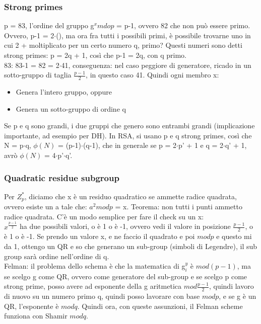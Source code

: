 \documentclass[16px]{article}
\begin{document}
\subsubsection{Strong primes}
p = 83, l'ordine del gruppo g$^xmdop$ = p-1, ovvero 82 che non può essere primo. Ovvero, p-1 = 2$\cdot$(), ma ora fra tutti i possibili primi, è possibile trovarne uno in cui 2 + moltiplicato per un certo numero q, primo? Questi numeri sono detti strong primes: p = 2q + 1, così che p-1 = 2q, con q primo.\\ 83: 83-1 = 82 = 2$\cdot$41, conseguenza: nel caso peggiore di generatore, ricado in un sotto-gruppo di taglia $\frac{p-1}{2}$, in questo caso 41. Quindi ogni membro x:
\begin{itemize}
\item Genera l'intero gruppo, oppure
\item Genera un sotto-gruppo di ordine q
\end{itemize} 
Se p e q sono grandi, i due gruppi che genero sono entrambi grandi (implicazione importante, ad esempio per DH). In RSA, si usano p e q strong primes, così che N = p$\cdot$q, $\phi(N)$ = (p-1)$\cdot$(q-1), che in generale se p = 2$\cdot$p' + 1 e q = 2$\cdot$q' + 1, avrò $\phi(N)$ = 4$\cdot$p'$\cdot$q'.
\subsubsection{Quadratic residue subgroup}
Per $Z_p^*$, diciamo che x è un residuo quadratico se ammette radice quadrata, ovvero esiste un a tale che: $a^2modp$ = x. Teorema: non tutti i punti ammetto radice quadrata. C'è un modo semplice per fare il check su un x: \\
$x^{\frac{p-1}{2}}$ ha due possibili valori, o è 1 o è -1, ovvero vedi il valore in posizione $\frac{p-1}{2}$, o è 1 o è -1. Se prendo un valore x, e ne faccio il quadrato e poi $modp$ e questo mi da 1, ottengo un QR e so che generano un sub-group (simboli di Legendre), il sub group sarà ordine nell'ordine di q.\\ Felman: il problema dello schema è che la matematica di g$^y_i$ è $mod(p-1)$, ma se scelgo g come QR, ovvero come generatore del sub-group e se scelgo p come strong prime, posso avere ad esponente della g aritmetica $mod\frac{p-1}{2}$, quindi lavoro di nuovo su un numero primo q, quindi posso lavorare con base $modp$, e se g è un QR, l'esponente è $modq$. Quindi ora, con queste assunzioni, il Felman scheme funziona con Shamir $modq$.
\end{document}
